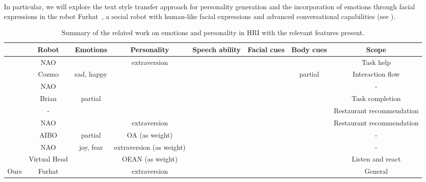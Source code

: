 \documentclass[nomenclature, english, biblatex]{kththesis}
\newcommand{\vmark}{\ding{51}}
\newcommand{\xmark}{\ding{55}}
\begin{document}
In particular, we will explore the text style transfer approach for personality generation and the incorporation of emotions through facial expressions in the robot Furhat~\cite{al2012furhat}, a social robot with human-like facial expressions and advanced conversational capabilities (see ). 
\begin{table}
    \centering
    \begin{adjustbox}{max width=\textwidth}
    \begin{tabular}{|c|c|c|c|c|c|c|c|}
        \hline
         & Robot & Emotions & Personality & Speech ability & Facial cues & Body cues & Scope \\
        \hline
        \hline
        \cite{andriella2020have} & NAO & \xmark & extraversion & \xmark & \xmark & \vmark & Task help\\
        \hline 
        \cite{cozmoEmotions} & Cozmo & sad, happy & \xmark & \xmark & \vmark & partial & Interaction flow\\
        \hline
        \cite{desire} & NAO & \vmark & \xmark & \xmark & \xmark & \vmark & -\\
        \hline 
        \cite{brianEmotions} & Brian & partial & \xmark & \vmark & \vmark & \vmark & Task completion\\
        \hline 
        \cite{mairesse2011controlling} & - & \xmark & \vmark & \vmark & \xmark & \xmark & Restaurant recommendation\\
        \hline 
        \cite{aly2013model} & NAO & \xmark & extraversion & \vmark & \xmark & \vmark & Restaurant recommendation\\
        \hline 
        \cite{moshkina2011tame} & AIBO & partial & OA (as weight) & \xmark & \xmark & \vmark & -\\
        \hline 
        \cite{moshkina2011tame} & NAO & joy, fear & extraversion (as weight) & \xmark & \xmark & \vmark & -\\
        \hline 
        \cite{han2012robotic} & Virtual Head & \vmark & OEAN (as weight) & \xmark & \vmark & \xmark & Listen and react\\
        \hline 
        \hline
        Ours & Furhat & \vmark & extraversion & \vmark & \vmark & \xmark & General\\
        \hline 
    \end{tabular}
    \end{adjustbox}
    \caption{Summary of the related work on emotions and personality in \gls{HRI} with the relevant features present.}
    \label{tab:related}
\end{table}
\cleardoublepage
\end{document}
